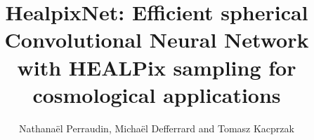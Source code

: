 \documentclass[final,twocolumn,3p,times,authoryear]{elsarticle}
\newcommand{\1}{\b{1}}              %
\newcommand{\0}{\b{0}}              %
\begin{document}
\begin{frontmatter}



\title{HealpixNet: Efficient spherical Convolutional Neural Network with HEALPix sampling for cosmological applications}


\author{Nathanaël Perraudin, Michaël Defferrard and Tomasz Kacprzak}

\address{}

\begin{abstract}




\end{abstract}
\end{frontmatter}
\end{document}
